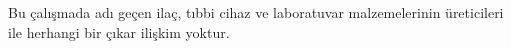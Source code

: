 

 
\begin{compactitem}
\item[\textbullet]Bu çalışmada adı geçen ilaç, tıbbi cihaz ve laboratuvar malzemelerinin üreticileri ile herhangi bir çıkar ilişkim yoktur.


\end{compactitem}



\bigskip
\hfill {\Fontlukas \authornames}\\
\smallskip

 \cleardoublepage
